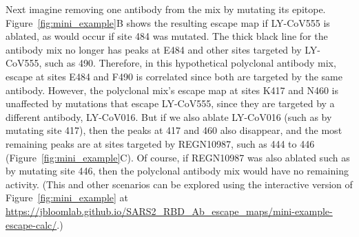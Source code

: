 \documentclass[9pt,twocolumn,twoside]{gsajnl_modified}
\begin{document}
Next imagine removing one antibody from the mix by mutating its epitope.
Figure~\ref{fig:mini_example}B shows the resulting escape map if LY-CoV555 is ablated, as would occur if site 484 was mutated.
The thick black line for the antibody mix no longer has peaks at E484 and other sites targeted by LY-CoV555, such as 490.
Therefore, in this hypothetical polyclonal antibody mix, escape at sites E484 and F490 is correlated since both are targeted by the same antibody.
However, the polyclonal mix's escape map at sites K417 and N460 is unaffected by mutations that escape LY-CoV555, since they are targeted by a different antibody, LY-CoV016.
But if we also ablate LY-CoV016 (such as by mutating site 417), then the peaks at 417 and 460 also disappear, and the most remaining peaks are at sites targeted by REGN10987, such as 444 to 446 (Figure~\ref{fig:mini_example}C).
Of course, if REGN10987 was also ablated such as by mutating site 446, then the polyclonal antibody mix would have no remaining activity.
(This and other scenarios can be explored using the interactive version of Figure~\ref{fig:mini_example} at \url{https://jbloomlab.github.io/SARS2_RBD_Ab_escape_maps/mini-example-escape-calc/}.)
\end{document}

